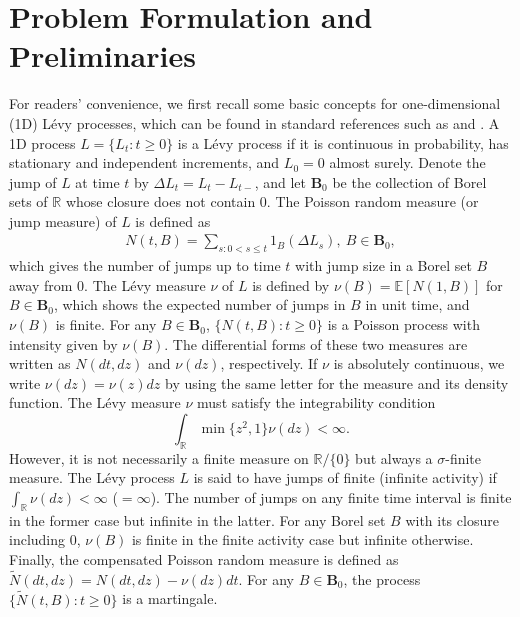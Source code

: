 \documentclass[11pt]{article}
\newcommand{\1}{\mathbbm{1}}
\begin{document}
\section{Problem Formulation and Preliminaries}\label{sec:formulation}
For readers' convenience, we first recall some basic concepts for one-dimensional (1D) L\'evy processes, which can be found in standard references such as \cite{sato1999levy} and \cite{applebaum2009levy}.
A 1D process $L=\{L_t: t \ge 0 \}$ is a L{\'e}vy process if it is continuous in probability, has stationary and independent increments, and $L_0=0$ almost surely. Denote the jump of $L$ at time $t$ by $\Delta L_t = L_t - L_{t-}$, and let $\pmb{\text{B}}_0$ be the collection of Borel sets of $\mathbb{R}$ whose closure does not contain $0$. The Poisson random measure (or jump measure) of $L$ is defined as
\begin{align}
	N(t, B) = \sum_{s: 0 < s \le t} 1_{B} (\Delta L_s),\ B\in \pmb{\text{B}}_0,
\end{align}
which gives the number of jumps up to time $t$ with jump size in a Borel set $B$ away from $0$. The L{\'e}vy measure $\nu$ of $L$ is defined by $\nu (B) = \mathbb{E} [ N(1, B)]$ for $B\in \pmb{\text{B}}_0$, which shows the expected number of jumps in $B$ in unit time, and $\nu (B)$ is finite. For any $B\in \pmb{\text{B}}_0$, $\{N(t, B): t\ge 0\}$ is a Poisson process with intensity given by $\nu(B)$. The differential forms of these two measures are written as $N(dt,dz)$ and $\nu(dz)$, respectively. If $\nu$ is absolutely continuous, we write $\nu(dz)=\nu(z)dz$ by using the same letter for the measure and its density function. The L\'evy measure $\nu$ must satisfy the integrability condition
\begin{equation}\label{eq:levy-integ-cond}
\int_{\mathbb{R}} \min\{z^2, 1\}\nu(dz)<\infty.
\end{equation}
However, it is not necessarily a finite measure on $\mathbb{R}/\{0\}$ but always a $\sigma$-finite measure. The L\'evy process $L$ is said to have jumps of finite (infinite activity) if $\int_{\mathbb{R}}\nu(dz)<\infty$ ($=\infty$). The number of jumps on any finite time interval is finite in the former case but infinite in the latter. For any Borel set $B$ with its closure including $0$,
$\nu(B)$ is finite in the finite activity case but infinite otherwise.
Finally, the compensated Poisson random measure is defined as $\widetilde{N}(dt, dz)=N(dt, dz)-\nu(dz)dt$. For any $B\in \pmb{\text{B}}_0$, the process $\{\widetilde{N}(t,B): t\ge 0\}$ is a martingale.
\end{document}
